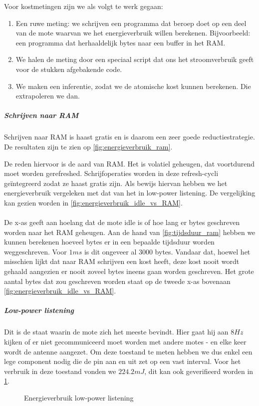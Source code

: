 \documentclass{article}
\begin{document}
Voor kostmetingen zijn we als volgt te werk gegaan:

\begin{enumerate}
\item Een ruwe meting: we schrijven een programma dat beroep doet op een deel
van de mote waarvan we het energieverbruik willen berekenen. Bijvoorbeeld: een
programma dat herhaaldelijk bytes naar een buffer in het RAM. 
\item We halen de meting door een speciaal script dat ons het stroomverbruik geeft voor de stukken afgebakende code.
\item We maken een inferentie, zodat we de atomische kost kunnen berekenen. Die extrapoleren we dan.
\end{enumerate}

\subparagraph{Schrijven naar RAM}

Schrijven naar RAM is haast gratis en is daarom een zeer goede
reductiestrategie. De resultaten zijn te zien op \ref{fig:energieverbruik_ram}.

De reden hiervoor is de aard van RAM. Het is volatiel geheugen, dat voortdurend
moet worden gerefreshed. Schrijfoperaties worden in deze refresh-cycli
ge\"integreerd zodat ze haast gratis zijn. Als bewijs hiervan hebben we het energieverbruik vergeleken met dat van het in low-power listening. 
De vergelijking kan gezien worden in \ref{fig:energieverbruik_idle_vs_RAM}.\\
\\
De x-as geeft aan hoelang dat de mote idle is of hoe lang er bytes geschreven worden naar het RAM geheugen. Aan de hand van \ref{fig:tijdsduur_ram} hebben we kunnen berekenen hoeveel bytes er in een bepaalde tijdsduur worden weggeschreven. Voor $1ms$ is dit ongeveer al 3000 bytes. Vandaar dat, hoewel het misschien lijkt dat naar RAM schrijven een kost heeft, deze kost nooit wordt gehaald aangezien er nooit zoveel bytes ineens gaan worden geschreven. Het grote aantal bytes dat zou geschreven worden staat op de tweede x-as bovenaan \ref{fig:energieverbruik_idle_vs_RAM}. 
\subparagraph{Low-power listening}
Dit is de staat waarin de mote zich het meeste bevindt. Hier gaat hij aan $8Hz$
kijken of er niet gecommuniceerd moet worden met andere motes - en elke keer
wordt de antenne aangezet. Om deze toestand te meten hebben we dus enkel een
lege component nodig die de pin aan en uit zet op een vast interval. Voor het
verbruik in deze toestand vonden we $224.2mJ$, dit kan ook geverifieerd worden
in \ref{fig:energieverbruik_lpl}.

\begin{figure}[h]
\centering

\caption{Energieverbruik low-power listening}
\label{fig:energieverbruik_lpl}
\end{figure}
\end{document}

